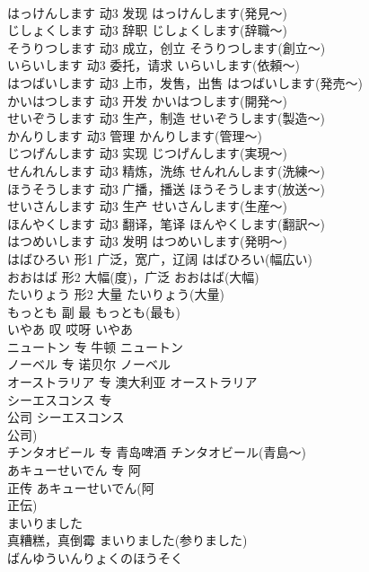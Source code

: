 \documentclass[8pt]{extreport}
\begin{document}
\begin{CJK}{UTF8}{min}
\\	はっけんします	动3	发现	はっけんします(発見～)	
\\	じしょくします	动3	辞职	じしょくします(辞職～)	
\\	そうりつします	动3	成立，创立	そうりつします(創立～)	
\\	いらいします	动3	委托，请求	いらいします(依頼～)	
\\	はつばいします	动3	上市，发售，出售	はつばいします(発売～)	
\\	かいはつします	动3	开发	かいはつします(開発～)	
\\	せいぞうします	动3	生产，制造	せいぞうします(製造～)	
\\	かんりします	动3	管理	かんりします(管理～)	
\\	じつげんします	动3	实现	じつげんします(実現～)	
\\	せんれんします	动3	精炼，洗练	せんれんします(洗練～)	
\\	ほうそうします	动3	广播，播送	ほうそうします(放送～)	
\\	せいさんします	动3	生产	せいさんします(生産～)	
\\	ほんやくします	动3	翻译，笔译	ほんやくします(翻訳～)	
\\	はつめいします	动3	发明	はつめいします(発明～)	
\\	はばひろい	形1	广泛，宽广，辽阔	はばひろい(幅広い)	
\\	おおはば	形2	大幅(度)，广泛	おおはば(大幅)	
\\	たいりょう	形2	大量	たいりょう(大量)	
\\	もっとも	副	最	もっとも(最も)	
\\	いやあ	叹	哎呀	いやあ	
\\	ニュートン	专	牛顿	ニュートン	
\\	ノーベル	专	诺贝尔	ノーベル	
\\	オーストラリア	专	澳大利亚	オーストラリア	
\\	シーエスコンス	专	
\\	公司	シーエスコンス
\\	公司)	
\\	チンタオビール	专	青岛啤酒	チンタオビール(青島～)	
\\	あキューせいでん	专	阿
\\	正传	あキューせいでん(阿
\\	正伝)	
\\	まいりました	
\\	真糟糕，真倒霉	まいりました(参りました)	
\\	ばんゆういんりょくのほうそく	

\end{CJK}
\end{document}
